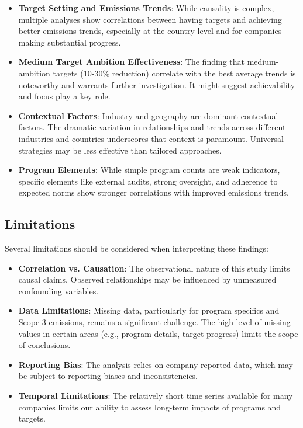 \documentclass[11pt,a4paper]{article}
\begin{document}
\begin{itemize}
    \item \textbf{Target Setting and Emissions Trends}: While causality is complex, multiple analyses show correlations between having targets and achieving better emissions trends, especially at the country level and for companies making substantial progress.
    
    \item \textbf{Medium Target Ambition Effectiveness}: The finding that medium-ambition targets (10-30\% reduction) correlate with the best average trends is noteworthy and warrants further investigation. It might suggest achievability and focus play a key role.
    
    \item \textbf{Contextual Factors}: Industry and geography are dominant contextual factors. The dramatic variation in relationships and trends across different industries and countries underscores that context is paramount. Universal strategies may be less effective than tailored approaches.
    
    \item \textbf{Program Elements}: While simple program counts are weak indicators, specific elements like external audits, strong oversight, and adherence to expected norms show stronger correlations with improved emissions trends.
\end{itemize}

\subsection{Limitations}
Several limitations should be considered when interpreting these findings:

\begin{itemize}
    \item \textbf{Correlation vs. Causation}: The observational nature of this study limits causal claims. Observed relationships may be influenced by unmeasured confounding variables.
    
    \item \textbf{Data Limitations}: Missing data, particularly for program specifics and Scope 3 emissions, remains a significant challenge. The high level of missing values in certain areas (e.g., program details, target progress) limits the scope of conclusions.
    
    \item \textbf{Reporting Bias}: The analysis relies on company-reported data, which may be subject to reporting biases and inconsistencies.
    
    \item \textbf{Temporal Limitations}: The relatively short time series available for many companies limits our ability to assess long-term impacts of programs and targets.
\end{itemize}
\end{document}
